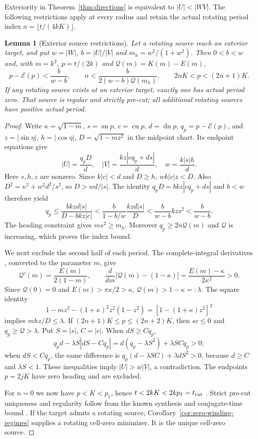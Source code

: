 \documentclass[11pt,a4paper]{article}
\newtheorem{lemma}[theorem]{Lemma}
\theoremstyle{remark}\newtheorem{remark}[theorem]{Remark}
\newcommand{\sn}{\operatorname{sn}}
\newcommand{\cn}{\operatorname{cn}}
\newcommand{\dn}{\operatorname{dn}}
\begin{document}
Exteriority in Theorem~\ref{thm:directions} is equivalent to
$|U|<|WV|$. The following restrictions apply at every radius and
retain the actual rotating period index $n=\lfloor t/(4kK)\rfloor$.

\begin{lemma}[Exterior source restrictions]\label{lem:exterior-periods}
Let a rotating source reach an exterior target, and put
$w=|W|$, $b=|U|/|V|$ and $m_h=w^2/(1+w^2)$.
Then $0<b<w$ and, with $m=k^2$, $p=t/(2k)$ and
$\mathcal Q(m)=K(m)-E(m)$,
\begin{equation}\label{eq:exterior-source-bounds}
 p-\mathcal E(p)<\frac{b}{w-b},\qquad
 n<\frac{b}{2(w-b)\mathcal Q(m_h)},\qquad
 2nK<p<(2n+1)K.
\end{equation}
If any rotating source exists at an exterior target, exactly one has
actual period zero. That source is regular and strictly pre-cut;
all additional rotating sources have positive actual period.
\end{lemma}
\begin{proof}
Write $\kappa=\sqrt{1-m}$, $s=\sn p$, $c=\cn p$, $d=\dn p$,
$q_p=p-\mathcal E(p)$, and
$z=|\sin\eta|$, $h=|\cos\eta|$, $D=\sqrt{1-mz^2}$ in the
midpoint chart. Its endpoint equations give
\[
 |U|=\frac{q_pD}{d},\quad
 |V|=\frac{kz|cq_p+ds|}{d},\quad w=\frac{k|s|h}{d}.
\]
Here $s,h,z$ are nonzero. Since $k|c|<d$ and $D\ge h$,
$wk|c|z<D$. Also
$D^2=\kappa^2+w^2d^2/s^2$, so $D>wd/|s|$.
The identity $q_pD=bkz|cq_p+ds|$ and $b<w$ therefore yield
\[
 q_p\le\frac{bkzd|s|}{D-bkz|c|}
 <\frac{b}{1-b/w}\frac{kzd|s|}{D}
 <\frac{b}{w-b}kzs^2<\frac{b}{w-b}.
\]
The heading constraint gives $ms^2\ge m_h$.
Moreover $q_p\ge2n\mathcal Q(m)$ and $\mathcal Q$ is increasing,
which proves the index bound.

We next exclude the second half of each period. The complete-integral
derivatives \cite[Section 19.4]{DLMF}, converted to the parameter $m$, give
\[
 \mathcal Q'(m)=\frac{E(m)}{2(1-m)},\qquad
 \frac{d}{dm}\bigl[\mathcal Q(m)-(1-\kappa)\bigr]
 =\frac{E(m)-\kappa}{2\kappa^2}>0.
\]
Since $\mathcal Q(0)=0$ and $E(m)>\pi\kappa/2>\kappa$,
$\mathcal Q(m)>1-\kappa=: \lambda$.
The square identity
\[
 1-mz^2-(1+\kappa)^2z^2(1-z^2)
 =[1-(1+\kappa)z^2]^2
\]
implies $mhz/D\le\lambda$.
If $(2n+1)K\le p\le(2n+2)K$, then $sc\le0$ and
$q_p\ge\mathcal Q>\lambda$. Put $S=|s|$, $C=|c|$.
When $dS\ge Cq_p$,
\[
 q_pd-\lambda S|dS-Cq_p|
 =d(q_p-\lambda S^2)+\lambda SCq_p>0;
\]
when $dS<Cq_p$, the same difference is
$q_p(d-\lambda SC)+\lambda dS^2>0$, because $d\ge C$ and
$\lambda S<1$. These inequalities imply $|U|>w|V|$, a contradiction.
The endpoints $p=2jK$ have zero heading and are excluded.

For $n=0$ we now have $p<K<p_1$, hence
$t<2kK<2kp_1=t_{\rm cut}$ \cite[(5.17)]{MS}\cite[(2.2)]{SS}.
Strict pre-cut uniqueness and regularity follow from the known synthesis
and conjugate-time bound \cite[Theorem 3.2]{SS}\cite{SC}.
If the target admits a rotating source, Corollary~\ref{cor:zero-winding-regimes}
supplies a rotating cell-zero minimizer. It is the unique cell-zero source.
\end{proof}
\end{document}
